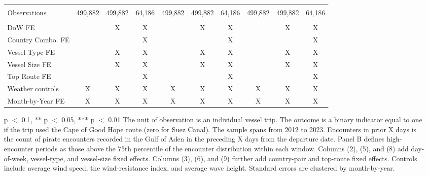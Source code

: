 \begin{table}
\begin{adjustbox}{width = .9\textwidth}
\begin{threeparttable}
\begin{tabular}[t]{lccccccccc}
 &  &  &  &  &  &  &  &  \vphantom{1} & \\
Observations & 499,882 & 499,882 & 64,186 & 499,882 & 499,882 & 64,186 & 499,882 & 499,882 & 64,186\\
 &  &  &  &  &  &  &  &  & \\
DoW FE &  & X & X &  & X & X &  & X & X\\
Country Combo. FE &  &  & X &  &  & X &  &  & X\\
Vessel Type FE &  & X & X &  & X & X &  & X & X\\
Vessel Size FE &  & X & X &  & X & X &  & X & X\\
Top Route FE &  &  & X &  &  & X &  &  & X\\
Weather controls & X & X & X & X & X & X & X & X & X\\
Month-by-Year FE & X & X & X & X & X & X & X & X & X\\
\bottomrule
\end{tabular}
\begin{tablenotes}
\item \scriptsize * p $<$ 0.1, ** p $<$ 0.05, *** p $<$ 0.01 The unit of observation is an individual vessel trip. The outcome is a binary indicator equal to one if the trip used the Cape of Good Hope route (zero for Suez Canal). The sample spans from 2012 to 2023. Encounters in prior X days is the count of pirate encounters recorded in the Gulf of Aden in the preceding X days from the departure date. Panel B defines high-encounter periods as those above the 75th percentile of the encounter distribution within each window. Columns (2), (5), and (8) add day-of-week, vessel-type, and vessel-size fixed effects. Columns (3), (6), and (9) further add country-pair and top-route fixed effects. Controls include average wind speed, the wind-resistance index, and average wave height. Standard errors are clustered by month-by-year.
\end{tablenotes}
\end{threeparttable}
\end{adjustbox}
\end{table}

